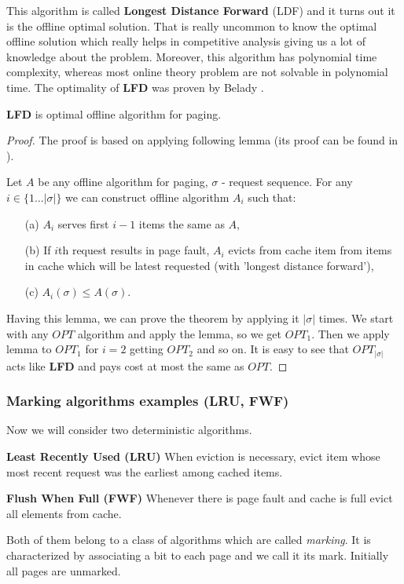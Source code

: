This algorithm is called \textbf{Longest Distance Forward} (LDF) and it turns 
out it is the offline optimal solution. That is really uncommon to know the 
optimal offline solution which really helps in competitive analysis giving us 
a lot of knowledge about the problem. Moreover, this algorithm has polynomial 
time complexity, whereas most online theory problem are not solvable in 
polynomial time. The optimality of \textbf{LFD} was proven by Belady 
\cite{LFDBelady}.
\begin{theorem} 
 \textbf{LFD} is optimal offline algorithm for paging.
\end{theorem}
\begin{proof}
 The proof is based on applying following lemma (its proof can be found in 
\cite{czarodziej}).
\begin{lemma}
Let $A$ be any offline algorithm for paging, $\sigma$ - request sequence. For 
any $i \in \{1 \ldots |\sigma|\}$ we can construct offline algorithm $A_i$ such 
that:
\begin{itemize}
 \item[(a)] $A_i$ serves first $i-1$ items the same as $A$,
 \item[(b)] If $i$th request results in page fault, $A_i$ evicts from cache 
item from items in cache which will be latest requested (with 'longest distance 
forward'),
  \item[(c)] $A_i(\sigma) \leq A(\sigma)$.
\end{itemize}
\end{lemma}
Having this lemma, we can prove the theorem by applying it $|\sigma|$ times. 
We start with any $OPT$ algorithm and apply the lemma, so we get $OPT_1$. Then 
we apply lemma to $OPT_1$ for $i=2$ getting $OPT_2$ and so on. It is easy to 
see that $OPT_{|\sigma|}$ acts like \textbf{LFD} and pays cost at most the 
same 
as $OPT$.
\end{proof}

\subsubsection{Marking algorithms examples (LRU, FWF)}
Now we will consider two deterministic algorithms.
\begin{myalgo}
 \textbf{Least Recently Used (LRU)}
 \newline
When eviction is necessary, evict item whose most recent request was the 
earliest among cached items.
\end{myalgo}
\begin{myalgo}
  \textbf{Flush When Full (FWF)}
  \newline
Whenever there is page fault and cache is full evict all elements from cache.
\end{myalgo}
Both of them belong to a class of algorithms which are called \textit{marking}. 
It is characterized by associating a bit to each page and we call 
it its mark. Initially all pages are unmarked. 

